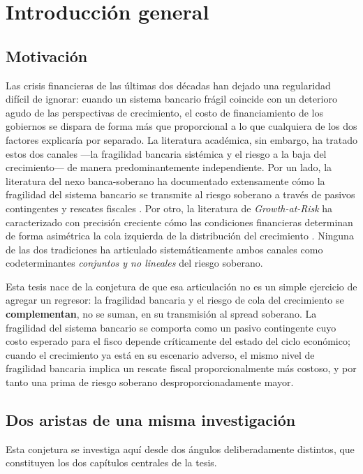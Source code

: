 \chapter{Introducción general}
\label{chap:intro}

\section{Motivación}

Las crisis financieras de las últimas dos décadas han dejado una regularidad difícil de ignorar: cuando un sistema bancario frágil coincide con un deterioro agudo de las perspectivas de crecimiento, el costo de financiamiento de los gobiernos se dispara de forma más que proporcional a lo que cualquiera de los dos factores explicaría por separado. La literatura académica, sin embargo, ha tratado estos dos canales —la fragilidad bancaria sistémica y el riesgo a la baja del crecimiento— de manera predominantemente independiente. Por un lado, la literatura del nexo banca-soberano ha documentado extensamente cómo la fragilidad del sistema bancario se transmite al riesgo soberano a través de pasivos contingentes y rescates fiscales \citep{FarhiTirole2018,AcharyaDrechslerSchnabl2014}. Por otro, la literatura de \textit{Growth-at-Risk} ha caracterizado con precisión creciente cómo las condiciones financieras determinan de forma asimétrica la cola izquierda de la distribución del crecimiento \citep{ABG2019}. Ninguna de las dos tradiciones ha articulado sistemáticamente ambos canales como codeterminantes \textit{conjuntos y no lineales} del riesgo soberano.

Esta tesis nace de la conjetura de que esa articulación no es un simple ejercicio de agregar un regresor: la fragilidad bancaria y el riesgo de cola del crecimiento se \textbf{complementan}, no se suman, en su transmisión al spread soberano. La fragilidad del sistema bancario se comporta como un pasivo contingente cuyo costo esperado para el fisco depende críticamente del estado del ciclo económico; cuando el crecimiento ya está en su escenario adverso, el mismo nivel de fragilidad bancaria implica un rescate fiscal proporcionalmente más costoso, y por tanto una prima de riesgo soberano desproporcionadamente mayor.

\section{Dos aristas de una misma investigación}

Esta conjetura se investiga aquí desde dos ángulos deliberadamente distintos, que constituyen los dos capítulos centrales de la tesis.


